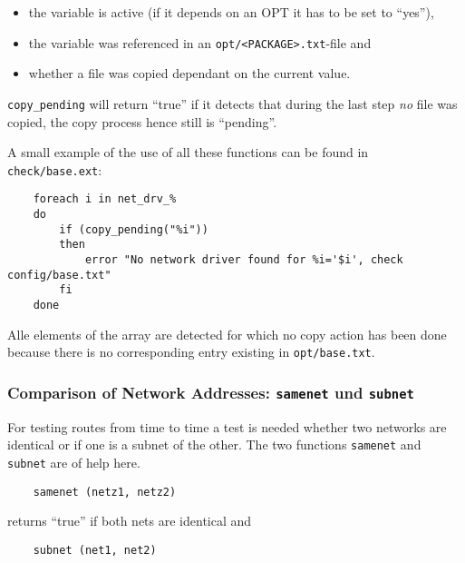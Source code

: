         \begin{itemize}
        \item the variable is active (if it depends on an OPT it has to be set to ``yes''),

         \item the variable was referenced in an \texttt{opt/<PACKAGE>.txt}-file and

         \item whether a file was copied dependant on the current value.

        \end{itemize}

        \texttt{copy\_pending} will return ``true'' if it detects that during
        the last step \emph{no} file was copied, the copy process hence still is ``pending''.

    A small example of the use of all these functions
    can be found in \texttt{check/base.ext}:

\begin{example}
\begin{verbatim}
    foreach i in net_drv_%
    do
        if (copy_pending("%i"))
        then
            error "No network driver found for %i='$i', check config/base.txt"
        fi
    done
\end{verbatim}
\end{example}

    Alle elements of the array  are detected for
    which no copy action has been done because there is no corresponding
    entry existing in \texttt{opt/base.txt}.

\subsubsection{Comparison of Network Addresses: \texttt{samenet} und \texttt{subnet}}

For testing routes from time to time a test is needed whether two
networks are identical or if one is a subnet of the other. The two
functions \texttt{samenet} and \texttt{subnet} are of help here.

\begin{example}
\begin{verbatim}
    samenet (netz1, netz2)
\end{verbatim}
\end{example}

returns ``true'' if both nets are identical and

\begin{example}
\begin{verbatim}
    subnet (net1, net2)
\end{verbatim}
\end{example}

